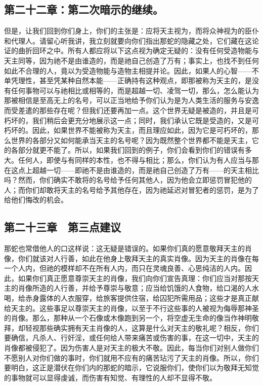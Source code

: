 
\subsection{第二十二章：第二次暗示的继续。}

但是，让我们回到你们身上，你们的主张是：应将天主视为，而将众神视为的臣仆和代理人。请留心听我讲，我立刻就要向你们指出那蛇的隐藏之处，它们藏在这论证的曲折回环之中。所有人都应将以下这点视为确定无疑的：没有任何受造物能与天主同等，因为祂不是由谁造的，而是祂自己创造了万有；事实上，也找不到任何如此不合理的人，竟以为受造物能与造物主相提并论。因此，如果人的心智——不单凭理性，甚至凭某种自然本能——正确持有这种观点，即那被称为天主的，是没有任何事物可以与祂相比或相等的，而是超越一切、凌驾一切，那么，怎么能认为那被相信是至高无上的名号，可以正当地给予你们认为是为人类生活的服务与安逸而受差遣的那些存在呢？但我们还要再加一点。这个世界无疑是被造的，并且是可朽坏的，我们稍后会更充分地展示这一点；同时，我们承认它既是受造的，又是可朽坏的。因此，如果世界不能被称为天主，而且理应如此，因为它是可朽坏的，那么世界的各部分又如何能承当天主的名号呢？因为既然整个世界都不能是天主，它的各部分就更不能了。所以，如果我们回到的例子，你们会看到你们的错误有多大。任何人，即使与有同样的本性，也不得与相比；那么，你们认为有人应当与那在这点上超越一切——即祂不是由谁造的，而是祂自己创造了万有——的天主相比吗？然而，你们确实不敢将的名号给予任何其他人，因为他会立即惩罚冒犯他的人；而你们却敢将天主的名号给予其他存在，因为祂延迟对冒犯者的惩罚，是为了给他们悔改的机会。\par


\subsection{第二十三章　第三点建议}

那蛇也常借他人的口这样说：这无疑是错误的。如果你们真的愿意敬拜天主的肖像，你们就该对人行善，如此在他身上敬拜天主的真实肖像。因为天主的肖像在每一个人内，但祂的模样却不在所有人内，而只在灵魂良善、心思纯洁的人内。因此，如果你们真正愿意尊崇天主的肖像，我们向你们宣告真理：你们应当对那按天主的肖像所造的人行善，并给予尊崇与敬意；应当给饥饿的人食物，给口渴的人水喝，给赤身露体的人衣服穿，给旅客提供住宿，给囚犯所需用品；这些才是真正献给天主的。这些事足以尊崇天主的肖像，以至于不行这些事的人被视为侮辱那神圣的肖像。那么，那种从一个石像或木像跑到另一个，将空虚无生命的像当作神明敬拜，却轻视那些确实拥有天主肖像的人，这算是什么对天主的敬礼呢？相反，你们要确信，凡杀人、行奸淫，或任何给人带来痛苦或伤害的事，在这一切中，天主的肖像都被侵犯了。因为伤害人是对天主的极大不敬。因此，每当你们对别人做你们不愿别人对你们做的事时，你们就用不应有的痛苦玷污了天主的肖像。所以，你们要明白，这正是潜伏在你们内的那蛇的暗示，它说服你们，使你们以为敬拜无知觉的事物就可以显得虔诚，而伤害有知觉、有理性的人却不显得不敬。\par

